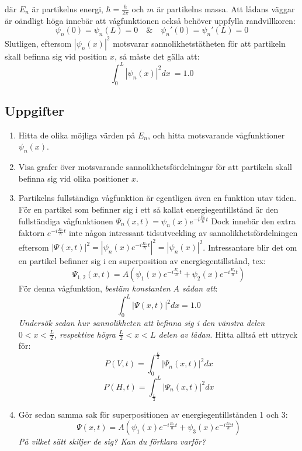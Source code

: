 \documentclass{article}
\newcommand{\wavefun}{\psi_n(x)}
\newcommand{\shrodprob}{|\psi_n(x)|^2}
\newcommand{\shrodtime}{e^{-i \frac{E_n}{\hbar} t}}
\newcommand{\fullshrodequ}{\Psi_n(x, t) = \psi_n(x) \shrodtime}
\newcommand{\fullshrodprob}{|\Psi_n(x,t)|^2}
\begin{document}
där $E_n$ är partikelns energi, $\hbar = \frac{h}{2\pi}$ och $m$ är partikelns massa.
Att lådans väggar är oändligt höga innebär att vågfunktionen också behöver uppfylla randvillkoren:
\begin{equation} \label{shrodequ_con1}
	\psi_n(0) = \psi_n(L) = 0 \quad \& \quad \psi_n'(0) = \psi_n'(L) = 0 
\end{equation}
Slutligen, eftersom $\shrodprob$ motsvarar sannolikhetstätheten för att partikeln skall befinna sig vid position $x$, så måste det gälla att:
\begin{equation} \label{shrodequ_con2}
	\int_0^L \shrodprob dx\ = 1.0
\end{equation}

\subsection{Uppgifter}
\begin{enumerate}
	\item Hitta de olika möjliga värden på $E_n$, och hitta motsvarande vågfunktioner $\wavefun$. 
	\item Visa grafer över motsvarande sannolikhetsfördelningar för att partikeln skall befinna sig vid olika positioner $x$.

	\item Partikelns fullständiga vågfunktion är egentligen även en funktion utav tiden. För en partikel som befinner sig i ett så kallat energiegentillstånd är den fullständiga vågfunktionen $\fullshrodequ$
		Dock innebär den extra faktorn $\shrodtime$ inte någon intressant tidsutveckling av sannolikhetsfördelningen eftersom $|\Psi(x, t)|^2 = |\psi_n(x) \shrodtime|^2 = \shrodprob$. Intressantare blir det om en partikel befinner sig i en superposition av energiegentillstånd, tex: $$\Psi_{1, 2}(x, t) = A(\psi_1(x)e^{-i \frac{E_1}{\hbar}t} + \psi_2(x) e^{-i \frac{E_2}{\hbar}t})$$ För denna vågfunktion, \emph{bestäm konstanten $A$ sådan att}: $$\int_0^L |\Psi(x, t)|^2 dx = 1.0$$ \emph{Undersök sedan hur sannolikheten att befinna sig i den vänstra delen $0 < x < \frac{L}{2}$, respektive högra $\frac{L}{2} < x < L$ delen av lådan}. Hitta alltså ett uttryck för: $$P(V, t) = \int_0^{\frac{L}{2}} \fullshrodprob dx$$ $$P(H, t) = \int_{\frac{L}{2}}^L \fullshrodprob dx$$

	\item Gör sedan samma sak för superpositionen av energiegentillstånden 1 och 3: $$\Psi(x, t) = A\left(\psi_1(x)e^{-i \frac{E_1}{\hbar}t} + \psi_3(x)e^{-i \frac{E_3}{\hbar}t}\right)$$ \emph{På vilket sätt skiljer de sig? Kan du förklara varför?}
\end{enumerate}
\end{document}
